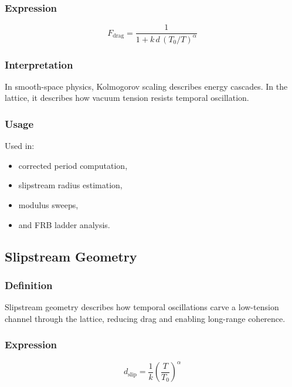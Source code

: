 \documentclass[12pt,oneside]{book}
\begin{document}
\subsubsection{Expression}


\[
F_{\mathrm{drag}} = \frac{1}{1 + k \, d \, (T_0 / T)^{\alpha}}
\]



\subsubsection{Interpretation}
In smooth-space physics, Kolmogorov scaling describes energy cascades.  
In the lattice, it describes how vacuum tension resists temporal oscillation.

\subsubsection{Usage}
Used in:
\begin{itemize}
    \item corrected period computation,
    \item slipstream radius estimation,
    \item modulus sweeps,
    \item and FRB ladder analysis.
\end{itemize}


\subsection{Slipstream Geometry}

\subsubsection{Definition}
Slipstream geometry describes how temporal oscillations carve a low-tension channel through
the lattice, reducing drag and enabling long-range coherence.

\subsubsection{Expression}


\[
d_{\mathrm{slip}} = \frac{1}{k} \left( \frac{T}{T_0} \right)^{\alpha}
\]
\end{document}
